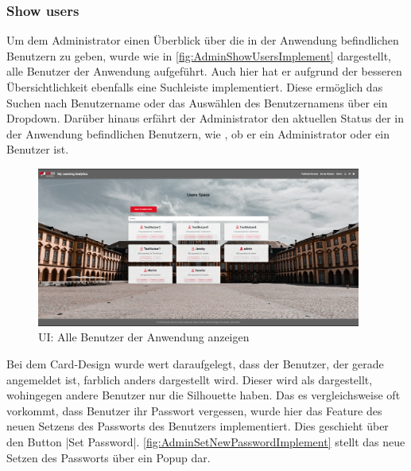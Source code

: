 \subsubsection*{Show users \faUsers}

Um dem Administrator einen Überblick über die in der Anwendung befindlichen Benutzern zu geben, wurde wie in \abb \vref{fig:AdminShowUsersImplement} dargestellt, alle Benutzer der Anwendung aufgeführt.
Auch hier hat er aufgrund der besseren Übersichtlichkeit ebenfalls eine Suchleiste implementiert. 
Diese ermöglich das Suchen nach Benutzername oder das Auswählen des Benutzernamens über ein Dropdown. 
Darüber hinaus erfährt der Administrator den aktuellen Status der in der Anwendung befindlichen Benutzern, wie \zb, ob er ein Administrator oder ein Benutzer ist.

\begin{figure}[hp]
	\centering
	\includegraphics[width=0.95\textwidth, keepaspectratio]{img/client/AdminShowUsers.png}
	\captionsetup{justification=centering, format=plain}
	\caption[\acf{UI}: Alle Benutzer der Anwendung anzeigen]{\acf{UI}: Alle Benutzer der Anwendung anzeigen \\ \quelleScreenshot}
	\label{fig:AdminShowUsersImplement}
\end{figure}

Bei dem Card-Design wurde wert daraufgelegt, dass der Benutzer, der gerade angemeldet ist, farblich anders dargestellt wird. 
Dieser wird als \faUser\xspace dargestellt, wohingegen andere Benutzer nur die Silhouette haben. \newline
Das es vergleichsweise oft vorkommt, dass Benutzer ihr Passwort vergessen, wurde hier das Feature des neuen Setzens des Passworts des Benutzers implementiert. 
Dies geschieht über den Button \jinline|Set Password|. \abb \vref{fig:AdminSetNewPasswordImplement} stellt das neue Setzen des Passworts über ein Popup dar.

